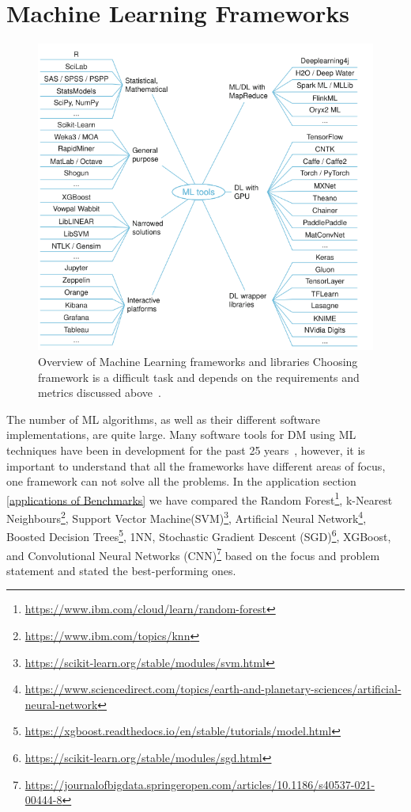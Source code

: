 \documentclass[a4paper,UKenglish,cleveref, autoref, thm-restate]{lipics-v2021}
\begin{document}
\section{Machine Learning Frameworks}
\begin{figure}[ht]
    \centering
    \includegraphics[width=13cm]{images/frameworks.PNG}
    \caption{ Overview of Machine Learning frameworks and libraries
Choosing framework is a difficult task and depends on the requirements and metrics discussed above~\cite{RefWorksframework}.}
    \label{fig:framework}
\end{figure}
\label{machine learning frameworks}
The number of ML algorithms, as well as
 their different software implementations, are quite
large.
Many software tools for DM using ML techniques have been in development for the past
25 years~\cite{RefWorksframework}, however, it is important to understand that all the frameworks have different areas of focus, one framework can not solve all the problems.
In the application section \ref{applications of Benchmarks} we have compared the Random Forest\footnote{\url{https://www.ibm.com/cloud/learn/random-forest}}, k-Nearest Neighbours\footnote{\url{https://www.ibm.com/topics/knn}}, Support Vector Machine(SVM)\footnote{\url{https://scikit-learn.org/stable/modules/svm.html}}, Artificial Neural Network\footnote{\url{https://www.sciencedirect.com/topics/earth-and-planetary-sciences/artificial-neural-network}}, Boosted Decision Trees\footnote{\url{https://xgboost.readthedocs.io/en/stable/tutorials/model.html}}, 1NN, Stochastic Gradient Descent (SGD)\footnote{\url{https://scikit-learn.org/stable/modules/sgd.html}}, XGBoost, and Convolutional Neural Networks (CNN)\footnote{\url{https://journalofbigdata.springeropen.com/articles/10.1186/s40537-021-00444-8}} based on the focus and problem statement and stated the best-performing ones.
 
\end{document}
